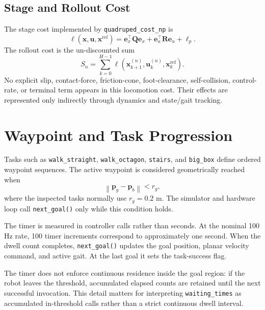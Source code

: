 \documentclass[11pt,a4paper]{article}
\newcommand{\norm}[1]{\left\lVert #1 \right\rVert}
\newcommand{\code}[1]{\texttt{#1}}
\begin{document}
\subsection{Stage and Rollout Cost}

The stage cost implemented by \code{quadruped\_cost\_np} is
\begin{equation}
  \boxed{
  \ell(\bm{x},\bm{u},\bm{x}^{\mathrm{ref}})
  =\bm{e}_x^\top\bm{Q}\bm{e}_x
  +\bm{e}_u^\top\bm{R}\bm{e}_u
  +\ell_p.}
  \label{eq:stage_cost}
\end{equation}
The rollout cost is the un-discounted sum
\begin{equation}
  S_n=\sum_{k=0}^{H-1}
  \ell(\bm{x}^{(n)}_{k+1},\bm{u}^{(n)}_k,
       \bm{x}^{\mathrm{ref}}_k).
  \label{eq:rollout_cost}
\end{equation}
No explicit slip, contact-force, friction-cone, foot-clearance, self-collision,
control-rate, or terminal term appears in this locomotion cost.  Their effects
are represented only indirectly through dynamics and state/gait tracking.

\section{Waypoint and Task Progression}

Tasks such as \code{walk\_straight}, \code{walk\_octagon}, \code{stairs}, and
\code{big\_box} define ordered waypoint sequences.  The active waypoint is
considered geometrically reached when
\begin{equation}
  \norm{\bm{p}_g-\bm{p}_b}<r_g,
\end{equation}
where the inspected tasks normally use $r_g=0.2$ m.  The simulator and
hardware loop call \code{next\_goal()} only while this condition holds.

The timer is measured in controller calls rather than seconds.  At the
nominal 100 Hz rate, 100 timer increments correspond to approximately one
second.  When the dwell count completes, \code{next\_goal()} updates the goal
position, planar velocity command, and active gait.  At the last goal it sets
the task-success flag.

The timer does not enforce continuous residence inside the goal region: if
the robot leaves the threshold, accumulated elapsed counts are retained until
the next successful invocation.  This detail matters for interpreting
\code{waiting\_times} as accumulated in-threshold calls rather than a strict
continuous dwell interval.
\end{document}
